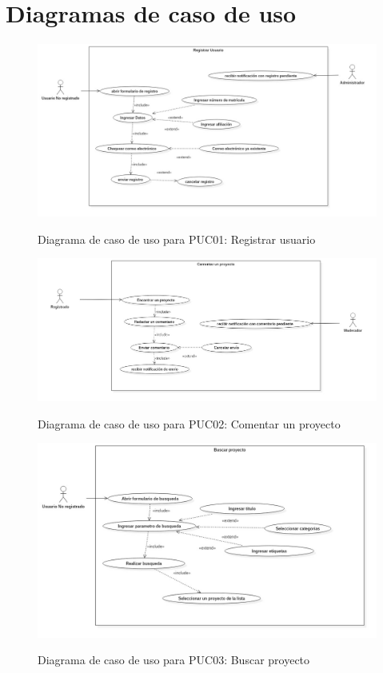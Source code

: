 \section{Diagramas de caso de uso}

\begin{figure}[!ht]
\includegraphics[width=\textwidth]{images/usecase/PUC01}
\label{FIG:CU_PUC01}
\caption{Diagrama de caso de uso para PUC01: Registrar usuario}
\end{figure}

\begin{figure}[!ht]
\includegraphics[width=\textwidth]{images/usecase/PUC02}
\label{FIG:CU_PUC02}
\caption{Diagrama de caso de uso para PUC02: Comentar un proyecto}
\end{figure}

\begin{figure}[!ht]
\includegraphics[width=\textwidth]{images/usecase/PUC03}
\label{FIG:CU_PUC03}
\caption{Diagrama de caso de uso para PUC03: Buscar proyecto}
\end{figure}

